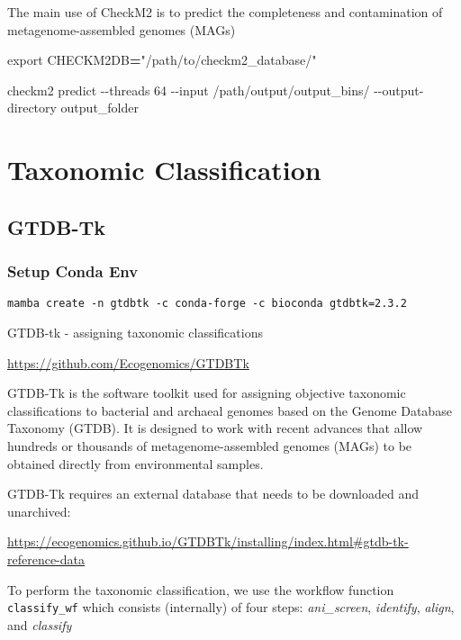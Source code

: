 \documentclass[
]{book}
\newenvironment{Shaded}{\begin{snugshade}}{\end{snugshade}}
\newcommand{\AttributeTok}[1]{\textcolor[rgb]{0.13,0.29,0.53}{#1}}
\newcommand{\BuiltInTok}[1]{#1}
\newcommand{\ExtensionTok}[1]{#1}
\newcommand{\NormalTok}[1]{#1}
\newcommand{\OperatorTok}[1]{\textcolor[rgb]{0.81,0.36,0.00}{\textbf{#1}}}
\newcommand{\StringTok}[1]{\textcolor[rgb]{0.31,0.60,0.02}{#1}}
\newcommand{\VariableTok}[1]{\textcolor[rgb]{0.00,0.00,0.00}{#1}}
\begin{document}
The main use of CheckM2 is to predict the completeness and contamination of metagenome-assembled genomes (MAGs)

\begin{Shaded}
\begin{Highlighting}[]
\BuiltInTok{export} \VariableTok{CHECKM2DB}\OperatorTok{=}\StringTok{"/path/to/checkm2\_database/"}

\ExtensionTok{checkm2}\NormalTok{ predict }\AttributeTok{{-}{-}threads}\NormalTok{ 64 }\AttributeTok{{-}{-}input}\NormalTok{ /path/output/output\_bins/ }\AttributeTok{{-}{-}output{-}directory}\NormalTok{ output\_folder}
\end{Highlighting}
\end{Shaded}

\section{Taxonomic Classification}\label{taxonomic-classification}

\subsection{GTDB-Tk}\label{gtdb-tk}

\subsubsection{Setup Conda Env}\label{setup-conda-env}

\begin{verbatim}
mamba create -n gtdbtk -c conda-forge -c bioconda gtdbtk=2.3.2
\end{verbatim}

GTDB-tk - assigning taxonomic classifications

\url{https://github.com/Ecogenomics/GTDBTk}

GTDB-Tk is the software toolkit used for assigning objective taxonomic classifications to bacterial and archaeal genomes based on the Genome Database Taxonomy (GTDB).
It is designed to work with recent advances that allow hundreds or thousands of metagenome-assembled genomes (MAGs) to be obtained directly from environmental samples.

GTDB-Tk requires an external database that needs to be downloaded and unarchived:

\url{https://ecogenomics.github.io/GTDBTk/installing/index.html\#gtdb-tk-reference-data}

To perform the taxonomic classification, we use the workflow function \texttt{classify\_wf} which consists (internally) of four steps: \emph{ani\_screen}, \emph{identify}, \emph{align}, and \emph{classify}
\end{document}
